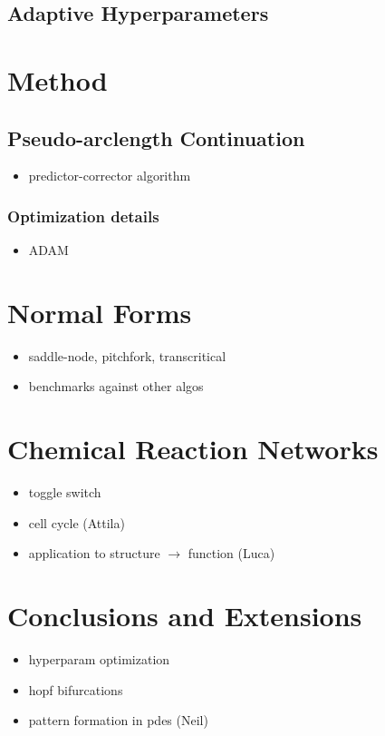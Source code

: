 \subsection{Adaptive Hyperparameters}


\section{Method}

\subsection{Pseudo-arclength Continuation}
\label{sec:continuation}

\begin{itemize}
    \item predictor-corrector algorithm
    \end{itemize}

\subsubsection{Optimization details}

\begin{itemize}
    \item ADAM
\end{itemize}

\section{Normal Forms}
\label{sec:normal-forms}

\begin{itemize}
    \item saddle-node, pitchfork, transcritical
    \item benchmarks against other algos
\end{itemize}


\section{Chemical Reaction Networks}
\label{sec:networks}

\begin{itemize}
    \item toggle switch
    \item cell cycle (Attila)
    \item application to structure $\rightarrow$ function (Luca)
\end{itemize}

\section{Conclusions and Extensions}
\label{sec:conclusions}

\begin{itemize}
    \item hyperparam optimization
    \item hopf bifurcations
    \item pattern formation in pdes (Neil)
\end{itemize}




